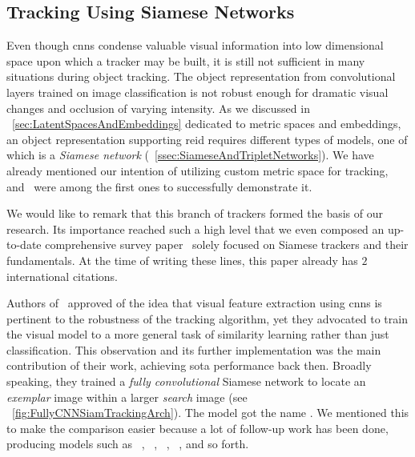 \subsection{Tracking Using Siamese Networks}
\label{ssec:TrackingUsingSiameseNetworks}

Even though \glspl{cnn} condense valuable visual information into low dimensional space upon which a tracker may be built, it is still not sufficient in many situations during object tracking. The object representation from convolutional layers trained on image classification is not robust enough for dramatic visual changes and occlusion of varying intensity. As we discussed in \sectionstr{}~\ref{sec:LatentSpacesAndEmbeddings} dedicated to metric spaces and embeddings, an object representation supporting \gls{reid} requires different types of models, one of which is a \emph{Siamese network} (\sectionstr{}~\ref{ssec:SiameseAndTripletNetworks}). We have already mentioned our intention of utilizing custom metric space for tracking, and~\cite{bertinetto2016siamfc} were among the first ones to successfully demonstrate it.

We would like to remark that this branch of trackers formed the basis of our research. Its importance reached such a high level that we even composed an up-to-date comprehensive survey paper~\cite{ondrasovic2021siamese} solely focused on Siamese trackers and their fundamentals. At the time of writing these lines, this paper already has $2$ international citations.

Authors of~\cite{bertinetto2016siamfc} approved of the idea that visual feature extraction using \glspl{cnn} is pertinent to the robustness of the tracking algorithm, yet they advocated to train the visual model to a more general task of similarity learning rather than just classification. This observation and its further implementation was the main contribution of their work, achieving \gls{sota} performance back then. Broadly speaking, they trained a \emph{fully convolutional} Siamese network to locate an \emph{exemplar} image within a larger \emph{search} image (see \figstr{}~\ref{fig:FullyCNNSiamTrackingArch}). The model got the name \siamfc{}. We mentioned this to make the comparison easier because a lot of follow-up work has been done, producing models such as \sasiam{}~\cite{he2018twofoldsiam}, \siamrpn{}~\cite{li2018siamrpn}, \siammask{}~\cite{wang2019siammask}, \siammaske{}~\cite{chen2019rotbboxes}, and so forth.

